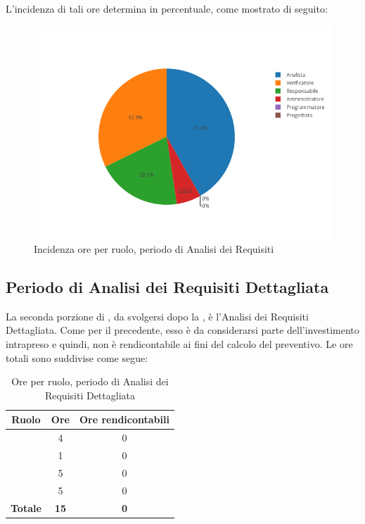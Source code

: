 L'incidenza di tali ore determina in percentuale, come mostrato di seguito:
\begin{figure}[H]
	\centering
	\includegraphics[scale=0.6]{img/AnalisiRequisiti.png}
	\caption{Incidenza ore per ruolo, periodo di Analisi dei Requisiti}
\end{figure}

\newpage
\subsection{Periodo di Analisi dei Requisiti Dettagliata}
La seconda porzione di \AdR, da svolgersi dopo la \RR, è l'Analisi dei Requisiti Dettagliata. Come per il precedente, esso è da considerarsi parte dell'investimento intrapreso e quindi, non è rendicontabile ai fini del calcolo del preventivo. Le ore totali sono suddivise come segue:

\begin{table}[H]
	\begin{center}
		\begin{tabular}{|c|c|c|}
			\hline
			\textbf{Ruolo}	& \textbf{Ore}	& \textbf{Ore rendicontabili} \\
			\hline
			\Res	&   4 	&  0  \\
			\hline
			\Amm	&   1	&  0	\\
			\hline
			\Ana	&   5	&  0	\\
			\hline
			\Ver	&   5	&  0	\\
			\hline
			\textbf{Totale} & \textbf{15} & \textbf{0} \\
			\hline
		\end{tabular}
	\end{center}
	\caption{Ore per ruolo, periodo di Analisi dei Requisiti Dettagliata}
\end{table}

